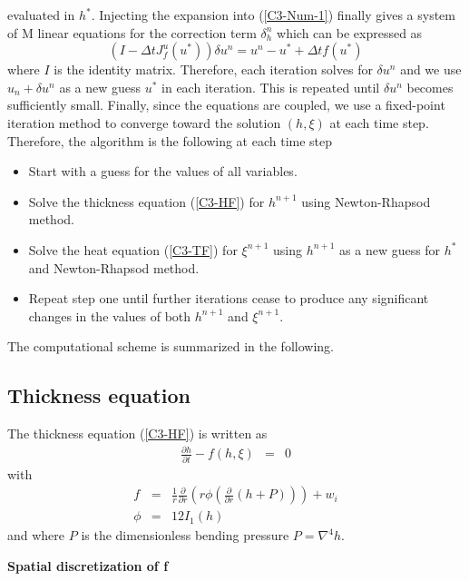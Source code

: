 evaluated  in $h^*$.   Injecting the  expansion into  (\ref{C3-Num-1})
finally gives a  system of M linear equations for  the correction term
$\delta_h^n$ which can be expressed as
\begin{equation}
  (I-\Delta tJ^u_{f}(u^*))\delta u^n=u^n-u^*+\Delta t f(u^*)
\end{equation}
where $I$ is the identity matrix. Therefore,  each iteration solves  for $\delta u^n$  and we
use $u_n+\delta u^n$  as a new guess $u^*$ in  each iteration. This is
repeated  until $\delta  u^n$  becomes  sufficiently small.   Finally,
since the equations are coupled, we use a fixed-point iteration method
to  converge  toward  the  solution   $(h,\xi)$  at  each  time  step.
Therefore, the algorithm is the following at each time step
\begin{itemize}
\item Start with a guess for the values of all variables.
\item Solve the thickness equation (\ref{C3-HF}) for $h^{n+1}$ using Newton-Rhapsod method.
\item Solve the heat equation (\ref{C3-TF}) for $\xi^{n+1}$ using $h^{n+1}$ as a new guess for $h^*$
  and Newton-Rhapsod method.
\item Repeat  step one until  further iterations cease to  produce any
  significant changes in the values of both $h^{n+1}$ and $\xi^{n+1}$.
\end{itemize}
The computational scheme is summarized in the following.

\subsection{Thickness equation}

The thickness equation (\ref{C3-HF}) is written as
\begin{eqnarray}
  \frac{\partial h}{\partial t}-f(h,\xi)&=&0
\end{eqnarray}
with
\begin{eqnarray}
  f& =& \frac{1}{r}
        \frac{\partial}{\partial      r}
        \left(      r  \phi\left(     \frac{\partial      }{\partial
        r}\left(h+P\right)\right)\right)+w_i\\
  \phi &=& 12I_1(h)
\end{eqnarray}
and where $P$ is the dimensionless bending pressure $P = \nabla^4h$.

\vspace{.5cm} \textbf{Spatial discretization of f} \vspace{.5cm}

